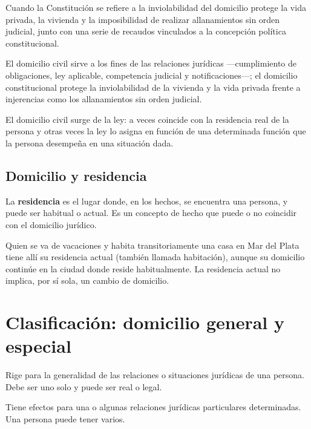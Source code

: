 \documentclass[12pt,oneside]{book}
\begin{document}
Cuando la Constitución se refiere a la inviolabilidad del domicilio protege la vida privada, la vivienda y la imposibilidad de realizar allanamientos sin orden judicial, junto con una serie de recaudos vinculados a la concepción política constitucional.

\begin{importante}
El domicilio civil sirve a los fines de las relaciones jurídicas ---cumplimiento de obligaciones, ley aplicable, competencia judicial y notificaciones---; el domicilio constitucional protege la inviolabilidad de la vivienda y la vida privada frente a injerencias como los allanamientos sin orden judicial.
\end{importante}

El domicilio civil surge de la ley: a veces coincide con la residencia real de la persona y otras veces la ley lo asigna en función de una determinada función que la persona desempeña en una situación dada.

\subsection{Domicilio y residencia}

La \textbf{residencia} es el lugar donde, en los hechos, se encuentra una persona, y puede ser habitual o actual. Es un concepto de hecho que puede o no coincidir con el domicilio jurídico.

\begin{ejemplo}
Quien se va de vacaciones y habita transitoriamente una casa en Mar del Plata tiene allí su residencia actual (también llamada habitación), aunque su domicilio continúe en la ciudad donde reside habitualmente. La residencia actual no implica, por sí sola, un cambio de domicilio.
\end{ejemplo}

\section{Clasificación: domicilio general y especial}

\begin{definicion}
Rige para la generalidad de las relaciones o situaciones jurídicas de una persona. Debe ser uno solo y puede ser real o legal.
\end{definicion}

\begin{definicion}
Tiene efectos para una o algunas relaciones jurídicas particulares determinadas. Una persona puede tener varios.
\end{definicion}
\end{document}
